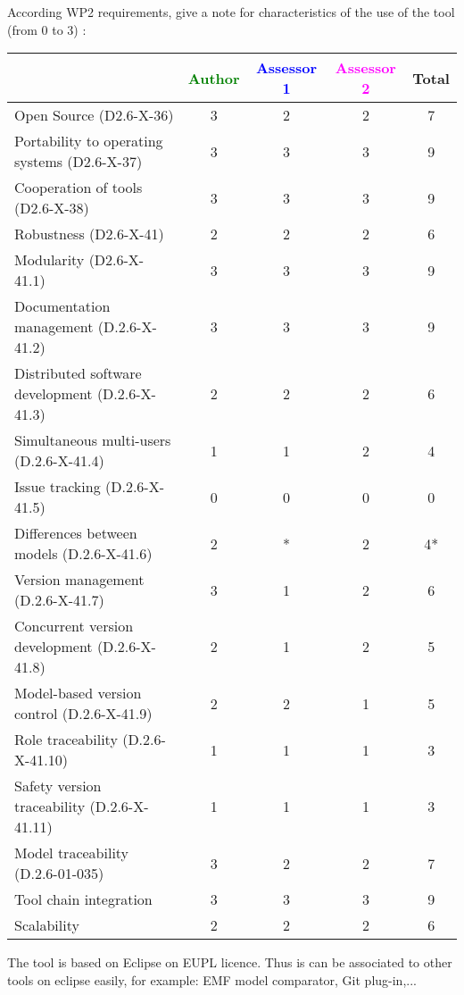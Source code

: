 According WP2 requirements, give a note for characteristics of the use of the tool (from 0 to 3) :

\begin{tabular}{|l | c | c | c | c|}
\hline
& \textcolor{green}{Author} & \textcolor{blue}{Assessor 1} & \textcolor{magenta}{Assessor 2} & Total \\
\hline 
Open Source (D2.6-X-36) & 3 & 2 & 2 & 7 \\
\hline 
Portability to operating systems (D2.6-X-37) & 3 & 3 & 3 & 9 \\
\hline
Cooperation of tools (D2.6-X-38) & 3 & 3 & 3 & 9 \\
\hline
Robustness (D2.6-X-41) & 2 & 2 & 2 & 6 \\
\hline
Modularity (D2.6-X-41.1) & 3 & 3 & 3 & 9 \\
\hline
Documentation management (D.2.6-X-41.2) & 3 & 3 & 3 & 9 \\
\hline
Distributed software development (D.2.6-X-41.3)  & 2 & 2 & 2 & 6 \\
\hline
Simultaneous multi-users (D.2.6-X-41.4)   & 1 & 1 & 2 & 4 \\
\hline
Issue tracking (D.2.6-X-41.5) & 0 & 0 & 0 & 0 \\
\hline
Differences between models (D.2.6-X-41.6) & 2 & * & 2 & 4* \\
\hline
Version management (D.2.6-X-41.7) & 3 & 1 & 2 & 6 \\
\hline
Concurrent version development (D.2.6-X-41.8) & 2 & 1 & 2 & 5 \\
\hline
Model-based version control (D.2.6-X-41.9) & 2 & 2 & 1 & 5 \\
\hline
Role traceability (D.2.6-X-41.10) & 1 & 1 & 1 & 3 \\
\hline
Safety version traceability (D.2.6-X-41.11) & 1 & 1 & 1 & 3 \\
\hline
Model traceability (D.2.6-01-035) & 3 & 2 & 2 & 7 \\
\hline
Tool chain integration & 3 & 3 & 3 & 9 \\
\hline
Scalability & 2 & 2 & 2 & 6 \\
\hline
\end{tabular}

\begin{author_comment}
The tool is based on Eclipse on EUPL licence. Thus is can be associated to  other tools on eclipse easily, for example: EMF model comparator, Git plug-in,...
\end{author_comment}

